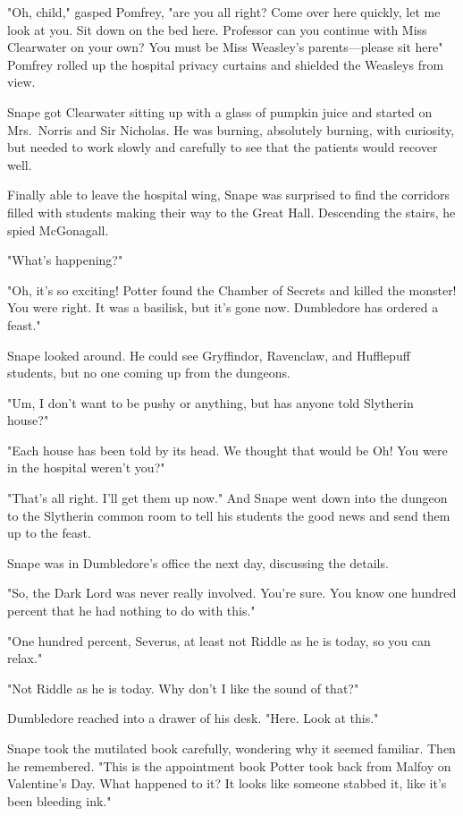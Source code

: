 "Oh, child," gasped Pomfrey, "are you all right? Come over here quickly, let me look at you. Sit down on the bed here. Professor can you continue with Miss Clearwater on your own? You must be Miss Weasley's parents—please sit here{\el}" Pomfrey rolled up the hospital privacy curtains and shielded the Weasleys from view.

Snape got Clearwater sitting up with a glass of pumpkin juice and started on Mrs.~Norris and Sir Nicholas. He was burning, absolutely burning, with curiosity, but needed to work slowly and carefully to see that the patients would recover well.

Finally able to leave the hospital wing, Snape was surprised to find the corridors filled with students making their way to the Great Hall. Descending the stairs, he spied McGonagall.

"What's happening?"

"Oh, it's so exciting! Potter found the Chamber of Secrets and killed the monster! You were right. It was a basilisk, but it's gone now. Dumbledore has ordered a feast."

Snape looked around. He could see Gryffindor, Ravenclaw, and Hufflepuff students, but no one coming up from the dungeons.

"Um, I don't want to be pushy or anything, but has anyone told Slytherin house?"

"Each house has been told by its head. We thought that would be{\el} Oh! You were in the hospital weren't you?"

"That's all right. I'll get them up now." And Snape went down into the dungeon to the Slytherin common room to tell his students the good news and send them up to the feast.

Snape was in Dumbledore's office the next day, discussing the details.

"So, the Dark Lord was never really involved. You're sure. You know one hundred percent that he had nothing to do with this."

"One hundred percent, Severus, at least not Riddle as he is today, so you can relax."

"Not Riddle as he is today. Why don't I like the sound of that?"

Dumbledore reached into a drawer of his desk. "Here. Look at this."

Snape took the mutilated book carefully, wondering why it seemed familiar. Then he remembered. "This is the appointment book Potter took back from Malfoy on Valentine's Day. What happened to it? It looks like someone stabbed it, like it's been bleeding ink."

